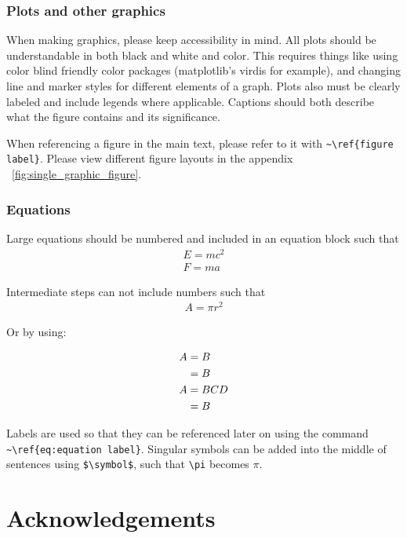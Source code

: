 \documentclass[twocolumn]{aastex631}
\begin{document}
\subsubsection{Plots and other graphics}

When making graphics, please keep accessibility in mind.
All plots should be understandable in both black and white and color.
This requires things like using color blind friendly color packages (matplotlib's virdis for example), and changing line and marker styles for different elements of a graph.
Plots also must be clearly labeled and include legends where applicable.
Captions should both describe what the figure contains and its significance.

When referencing a figure in the main text, please refer to it with \verb|~\ref{figure label}|.
Please view different figure layouts in the appendix ~\ref{fig:single_graphic_figure}.



\subsubsection{Equations}

Large equations should be numbered and included in an equation block such that
\begin{align}
    E=mc^2 \label{eq:1} \\
    F=ma \label{eq:2}
\end{align}


Intermediate steps can not include numbers such that
\begin{align*}
    A = \pi r^2
\end{align*}

Or by using:

\begin{align}
    A
        &=B         \label{eq:3}\\
        &=B         \notag\\
    A
        &=BCD       \label{eq:4}\\
        &=B         \notag
\end{align}


Labels are used so that they can be referenced later on using the command \verb|~\ref{eq:equation label}|.  Singular symbols can be added into the middle of sentences using \verb|$\symbol$|, such that \verb|\pi| becomes $\pi$.

\section {Acknowledgements}
\end{document}
